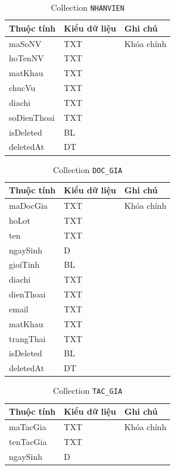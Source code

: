 \documentclass[../main.tex]{subfiles}
\begin{document}
\begin{longtable}{|p{5.7cm}|p{2.4cm}|p{5.2cm}|}
\caption{Collection \texttt{NHANVIEN}}\\
\hline
\textbf{Thuộc tính} & \textbf{Kiểu dữ liệu} & \textbf{Ghi chú} \\
\hline
maSoNV & TXT & Khóa chính \\
\hline
hoTenNV & TXT &  \\
\hline
matKhau & TXT &  \\
\hline
chucVu & TXT &  \\
\hline
diachi & TXT &  \\
\hline
soDienThoai & TXT &  \\
\hline
isDeleted & BL &  \\
\hline
deletedAt & DT &  \\
\hline
\end{longtable}

\begin{longtable}{|p{5.7cm}|p{2.4cm}|p{5.2cm}|}
\caption{Collection \texttt{DOC\_GIA}}\\
\hline
\textbf{Thuộc tính} & \textbf{Kiểu dữ liệu} & \textbf{Ghi chú} \\
\hline
maDocGia & TXT & Khóa chính \\
\hline
hoLot & TXT &  \\
\hline
ten & TXT &  \\
\hline
ngaySinh & D &  \\
\hline
gioiTinh & BL &  \\
\hline
diachi & TXT &  \\
\hline
dienThoai & TXT &  \\
\hline
email & TXT &  \\
\hline
matKhau & TXT &  \\
\hline
trangThai & TXT &  \\
\hline
isDeleted & BL &  \\
\hline
deletedAt & DT &  \\
\hline
\end{longtable}

\begin{longtable}{|p{5.7cm}|p{2.4cm}|p{5.2cm}|}
\caption{Collection \texttt{TAC\_GIA}}\\
\hline
\textbf{Thuộc tính} & \textbf{Kiểu dữ liệu} & \textbf{Ghi chú} \\
\hline
maTacGia & TXT & Khóa chính \\
\hline
tenTacGia & TXT &  \\
\hline
ngaySinh & D &  \\
\hline
\end{longtable}
\end{document}

